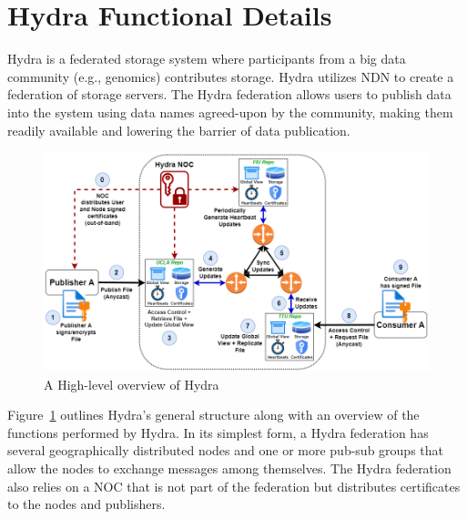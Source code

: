 \section{Hydra Functional Details} \label{sec:overview}



Hydra is a federated storage system where participants from a big data community (e.g., genomics) contributes storage. Hydra utilizes NDN to create a federation of storage servers. The Hydra federation allows users to publish data into the system using data names agreed-upon by the community, making them readily available and lowering the barrier of data publication.


\begin{figure}[!ht]
    \centering
    \includegraphics[width=\textwidth]{visuals/overview.png}
    \caption{A High-level overview of Hydra}
    \label{fig:overview}
\end{figure}

 Figure~\ref{fig:overview} outlines Hydra's general structure along with an overview of the functions performed by Hydra. In its simplest form, a Hydra federation has several geographically distributed nodes and one or more pub-sub groups that allow the nodes to exchange messages among themselves. The Hydra federation also relies on a NOC that is not part of the federation but distributes certificates to the nodes and publishers. 

